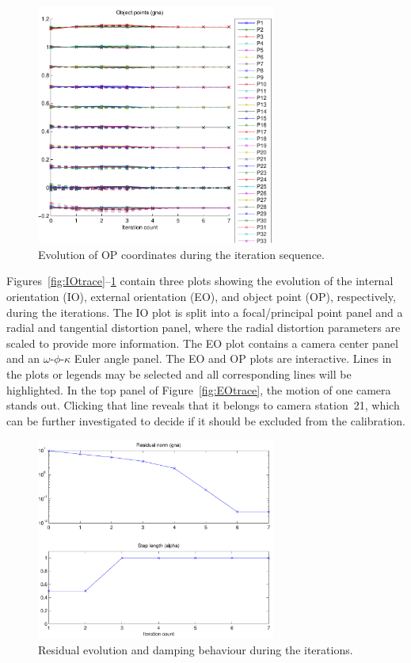\documentclass{article}
\begin{document}
\begin{figure}
  \centering
  \includegraphics[width=0.7\textwidth]{ill/ccamoptrace}
    \caption{Evolution of OP coordinates during the iteration
      sequence.}
    \label{fig:OPtrace}
\end{figure}

Figures~\ref{fig:IOtrace}--\ref{fig:OPtrace} contain three plots
showing the evolution of the internal orientation (IO), external
orientation (EO), and object point (OP), respectively, during the
iterations. The IO plot is split into a focal/principal point panel
and a radial and tangential distortion panel, where the radial
distortion parameters are scaled to provide more information. The EO
plot contains a camera center panel and an $\omega$-$\phi$-$\kappa$
Euler angle panel. The EO and OP plots are interactive. Lines in the
plots or legends may be selected and all corresponding lines will be
highlighted. In the top panel of Figure~\ref{fig:EOtrace}, the motion
of one camera stands out. Clicking that line reveals that it belongs
to camera station~21, which can be further investigated to decide if
it should be excluded from the calibration.

\begin{figure}
  \centering
  \includegraphics[width=0.7\textwidth]{ill/ccamgnatrace}
  \caption{Residual evolution and damping behaviour during the
    iterations.}
  \label{fig:gnatrace}
\end{figure}
\end{document}
